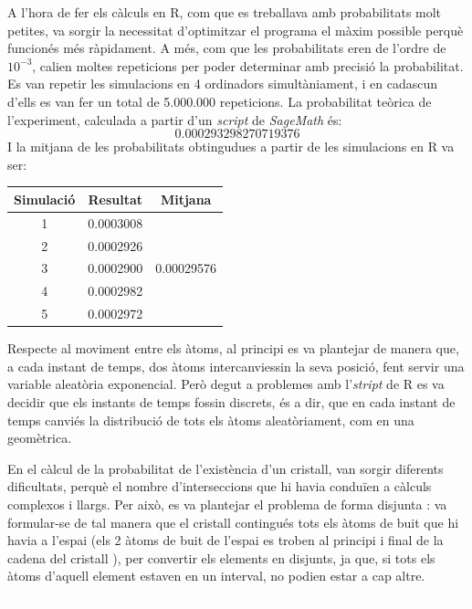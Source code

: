 \documentclass[12pt]{report}
\begin{document}
A l’hora de fer els càlculs en R, com que es treballava amb probabilitats molt petites, va sorgir la necessitat d'optimitzar el programa el màxim possible perquè funcionés més ràpidament. 
A més, com que les probabilitats eren de l'ordre de $10^{-3}$, calien moltes repeticions per poder determinar amb precisió la probabilitat.  Es van repetir les simulacions en 4 ordinadors simultàniament, i en cadascun d'ells es van fer un total de 5.000.000 repeticions.
La probabilitat teòrica de l'experiment, calculada a partir d'un \textit{script} de \textit{SageMath} és:
\begin{equation*}
0.000293298270719376
\end{equation*}
\newpage
I la mitjana de les probabilitats obtingudues a partir de les simulacions en R va ser:

\begin{center}
    \begin{tabular}{cc|c}
     Simulació & Resultat & Mitjana \\ \hline
      1 & 0.0003008\\
      2 & 0.0002926\\
      3 & 0.0002900 & 0.00029576\\
      4 & 0.0002982\\
      5 & 0.0002972\\
\end{tabular}
\end{center}

Respecte al moviment entre els àtoms, al principi es va plantejar de manera que, a cada instant de temps, dos àtoms intercanviessin la seva posició, fent servir una variable aleatòria exponencial. Però degut a problemes amb l'\textit{stript} de R es va decidir que els instants de temps fossin discrets, és a dir, que en cada instant de temps canviés la distribució de tots els àtoms aleatòriament, com en una geomètrica.\newline

En el càlcul de la probabilitat de l'existència d'un cristall, van sorgir diferents dificultats, perquè el nombre d'interseccions que hi havia conduïen a càlculs complexos i llargs. Per això, es va plantejar el problema de forma disjunta : va formular-se de tal manera que el cristall contingués tots els àtoms de buit que hi havia a l'espai (els 2 àtoms de buit de l'espai es troben al principi i final de la cadena del cristall ), per convertir els elements en disjunts, ja que, si tots els àtoms d’aquell element estaven en un interval, no podien estar a cap altre.
\newpage
\textcolor{white}{easter egg}
\end{document}
